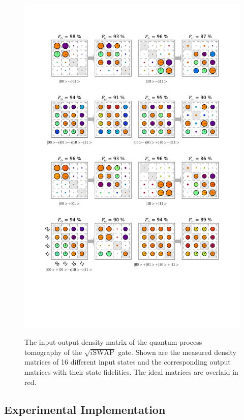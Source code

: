 \begin{figure}[p]
	\centering
		\includegraphics[width=1\textwidth]{"./data/ct5/2011_04_21 - grover and tomo/good_data/process -matrices 2"}
	\label{fig:ProcessInputOutputMatrices2}
	\caption{The input-output density matrix of the quantum process tomography of the $\sqrt{i\mathrm{SWAP}}$ gate. Shown are the measured density matrices of 16 different input states and the corresponding output matrices with their state fidelities. The ideal matrices are overlaid in red.}
\end{figure}

\subsection{Experimental Implementation}

